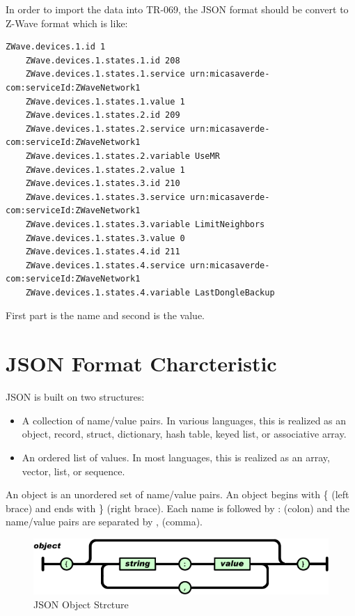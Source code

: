 In order to import the data into TR-069, the JSON format should be convert to Z-Wave format which is like:
\begin{lstlisting}[mathescape]
    ZWave.devices.1.id 1
    ZWave.devices.1.states.1.id 208
    ZWave.devices.1.states.1.service urn:micasaverde-com:serviceId:ZWaveNetwork1
    ZWave.devices.1.states.1.value 1
    ZWave.devices.1.states.2.id 209
    ZWave.devices.1.states.2.service urn:micasaverde-com:serviceId:ZWaveNetwork1
    ZWave.devices.1.states.2.variable UseMR
    ZWave.devices.1.states.2.value 1
    ZWave.devices.1.states.3.id 210
    ZWave.devices.1.states.3.service urn:micasaverde-com:serviceId:ZWaveNetwork1
    ZWave.devices.1.states.3.variable LimitNeighbors
    ZWave.devices.1.states.3.value 0
    ZWave.devices.1.states.4.id 211
    ZWave.devices.1.states.4.service urn:micasaverde-com:serviceId:ZWaveNetwork1
    ZWave.devices.1.states.4.variable LastDongleBackup
\end{lstlisting}

First part is the name and second is the value.
\section{JSON Format Charcteristic}
JSON is built on two structures:

\begin{itemize}
  \item A collection of name/value pairs. In various languages, this is realized as an object, record, struct, dictionary, hash table, keyed list, or associative array.
  \item An ordered list of values. In most languages, this is realized as an array, vector, list, or sequence.
\end{itemize}
An object is an unordered set of name/value pairs. An object begins with \{ (left brace) and ends with \} (right brace). Each name is followed by : (colon) and the name/value pairs are separated by , (comma).

\begin{figure}[htbp]
	\centering
		\includegraphics[width=12cm]{Figures/jsonobject.png}
	\caption[JSON Object Strcture]{JSON Object Strcture}
\end{figure}

